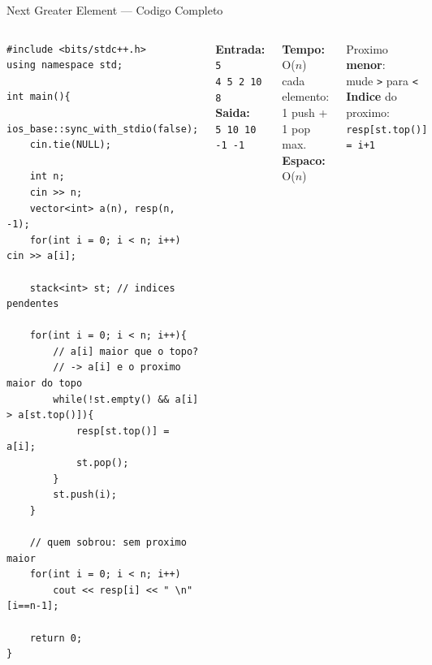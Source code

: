 \documentclass[aspectratio=169,11pt]{beamer}
\begin{document}
\begin{frame}[fragile,shrink=10]{Next Greater Element --- Codigo Completo}
  \begin{columns}[t]
      \begin{tcolorbox}[caixaCodigo]
        \begin{lstlisting}[style=cppcompact]
#include <bits/stdc++.h>
using namespace std;

int main(){
    ios_base::sync_with_stdio(false);
    cin.tie(NULL);

    int n;
    cin >> n;
    vector<int> a(n), resp(n, -1);
    for(int i = 0; i < n; i++) cin >> a[i];

    stack<int> st; // indices pendentes

    for(int i = 0; i < n; i++){
        // a[i] maior que o topo?
        // -> a[i] e o proximo maior do topo
        while(!st.empty() && a[i] > a[st.top()]){
            resp[st.top()] = a[i];
            st.pop();
        }
        st.push(i);
    }

    // quem sobrou: sem proximo maior
    for(int i = 0; i < n; i++)
        cout << resp[i] << " \n"[i==n-1];

    return 0;
}
        \end{lstlisting}
      \end{tcolorbox}
      \begin{tcolorbox}[caixaVerde,title={Exemplo}]
        \footnotesize
        \textbf{Entrada:}\\
        \texttt{5}\\
        \texttt{4 5 2 10 8}\\[6pt]
        \textbf{Saida:}\\
        \texttt{5 10 10 -1 -1}
      \end{tcolorbox}
      \vspace{0.12cm}
      \begin{tcolorbox}[caixaAzul,title={Complexidade}]
        \footnotesize
        \textbf{Tempo:} O($n$)\\
        cada elemento:\\
        1 push + 1 pop max.\\[4pt]
        \textbf{Espaco:} O($n$)
      \end{tcolorbox}
      \vspace{0.12cm}
      \begin{tcolorbox}[caixaVermelho,title={Variacoes}]
        \footnotesize
        Proximo \textbf{menor}:\\
        mude \texttt{>} para \texttt{<}\\[3pt]
        \textbf{Indice} do proximo:\\
        \texttt{resp[st.top()] = i+1}
      \end{tcolorbox}
  \end{columns}
\end{frame}
\end{document}
